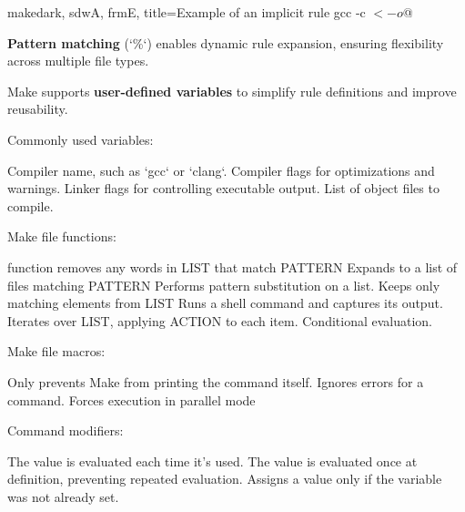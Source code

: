 \begin{NxCodeBox}{make}{dark, sdwA, frmE, title={Example of an implicit rule}}
		gcc -c $< -o $@
\end{NxCodeBox}

\bigskip

\begin{NxSSSSBox}[breakable]
	\begin{NxIDBox}
		\textbf{Pattern matching} (`\%`) enables dynamic rule expansion, ensuring flexibility across multiple file types.
	\end{NxIDBox}
\end{NxSSSSBox}

\begin{NxSSSSBox}
	\begin{NxIDBox}
		Make supports \textbf{user-defined variables} to simplify rule definitions and improve reusability.
	\end{NxIDBox}
	\begin{NxIDBox}
		Commonly used variables:
		\begin{NxListDark}
			 Compiler name, such as `gcc` or `clang`.
			 Compiler flags for optimizations and warnings.
			 Linker flags for controlling executable output.
			 List of object files to compile.
		\end{NxListDark}
	\end{NxIDBox}
	\begin{NxIDBox}
		Make file functions:
		\begin{NxListDark}
			 function removes any words in LIST that match PATTERN
			 Expands to a list of files matching PATTERN
			 Performs pattern substitution on a list.
			 Keeps only matching elements from LIST
			 Runs a shell command and captures its output.
			 Iterates over LIST, applying ACTION to each item.
			 Conditional evaluation.
		\end{NxListDark}
	\end{NxIDBox}
	\begin{NxIDBox}
		Make file macros:
		\begin{NxListDark}
			\nxIDSTopic{\nxAt} Only prevents Make from printing the command itself.
			\nxIDSTopic{\nxMinus} Ignores errors for a command.
			\nxIDSTopic{\nxPlus} Forces execution in parallel mode
		\end{NxListDark}
	\end{NxIDBox}
	\begin{NxIDBox}
		Command modifiers:
		\begin{NxListDark}
			\nxIDSTopic{=} The value is evaluated each time it's used.
			\nxIDSTopic{:=} The value is evaluated once at definition, preventing repeated evaluation.
			 Assigns a value only if the variable was not already set.
		\end{NxListDark}
	\end{NxIDBox}
\end{NxSSSSBox}

